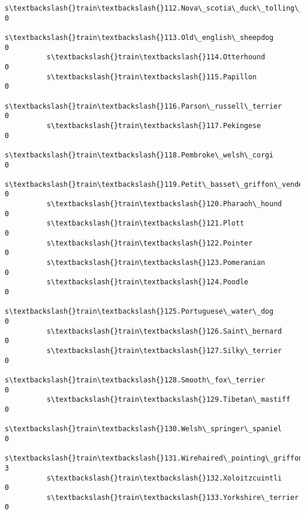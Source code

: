 \documentclass[11pt]{article}
\begin{document}
\begin{Verbatim}[commandchars=\\\{\}]
          s\textbackslash{}train\textbackslash{}112.Nova\_scotia\_duck\_tolling\_retriever                                        0   
          s\textbackslash{}train\textbackslash{}113.Old\_english\_sheepdog                                                      0   
          s\textbackslash{}train\textbackslash{}114.Otterhound                                                                0   
          s\textbackslash{}train\textbackslash{}115.Papillon                                                                  0   
          s\textbackslash{}train\textbackslash{}116.Parson\_russell\_terrier                                                    0   
          s\textbackslash{}train\textbackslash{}117.Pekingese                                                                 0   
          s\textbackslash{}train\textbackslash{}118.Pembroke\_welsh\_corgi                                                      0   
          s\textbackslash{}train\textbackslash{}119.Petit\_basset\_griffon\_vendeen                                              0   
          s\textbackslash{}train\textbackslash{}120.Pharaoh\_hound                                                             0   
          s\textbackslash{}train\textbackslash{}121.Plott                                                                     0   
          s\textbackslash{}train\textbackslash{}122.Pointer                                                                   0   
          s\textbackslash{}train\textbackslash{}123.Pomeranian                                                                0   
          s\textbackslash{}train\textbackslash{}124.Poodle                                                                    0   
          s\textbackslash{}train\textbackslash{}125.Portuguese\_water\_dog                                                      0   
          s\textbackslash{}train\textbackslash{}126.Saint\_bernard                                                             0   
          s\textbackslash{}train\textbackslash{}127.Silky\_terrier                                                             0   
          s\textbackslash{}train\textbackslash{}128.Smooth\_fox\_terrier                                                        0   
          s\textbackslash{}train\textbackslash{}129.Tibetan\_mastiff                                                           0   
          s\textbackslash{}train\textbackslash{}130.Welsh\_springer\_spaniel                                                    0   
          s\textbackslash{}train\textbackslash{}131.Wirehaired\_pointing\_griffon                                               3   
          s\textbackslash{}train\textbackslash{}132.Xoloitzcuintli                                                            0   
          s\textbackslash{}train\textbackslash{}133.Yorkshire\_terrier                                                         0   
          

\end{Verbatim}
\end{document}
